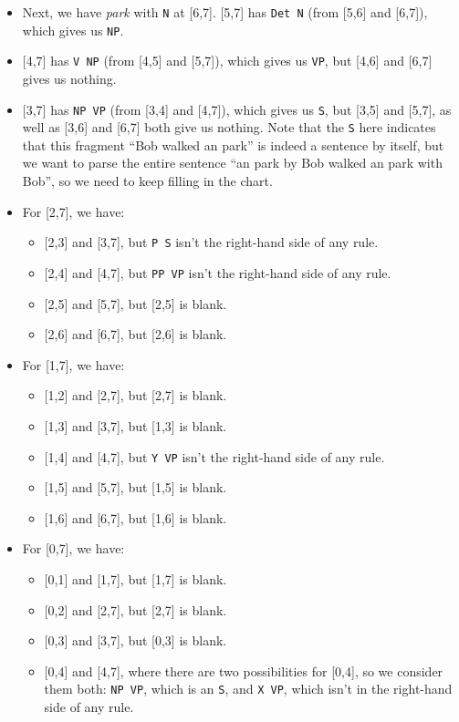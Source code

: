 \documentclass[a4paper]{article}
\begin{document}
\begin{enumerate}
\begin{enumerate}
\begin{enumerate}
\begin{itemize}
\item Next, we have \textit{park} with \texttt{N} at [6,7]. [5,7] has \texttt{Det N} (from [5,6] and [6,7]), which gives us \texttt{NP}.
\item{} [4,7] has \texttt{V NP} (from [4,5] and [5,7]), which gives us \texttt{VP}, but [4,6] and [6,7] gives us nothing.
\item{} [3,7] has \texttt{NP VP} (from [3,4] and [4,7]), which gives us \texttt{S}, but [3,5] and [5,7], as well as [3,6] and [6,7] both give us nothing. Note that the \texttt{S} here indicates that this fragment ``Bob walked an park'' is indeed a sentence by itself, but we want to parse the entire sentence ``an park by Bob walked an park with Bob'', so we need to keep filling in the chart.
\item For [2,7], we have:
\begin{itemize}
\item{} [2,3] and [3,7], but \texttt{P S} isn't the right-hand side of any rule.
\item{} [2,4] and [4,7], but \texttt{PP VP} isn't the right-hand side of any rule.
\item{} [2,5] and [5,7], but [2,5] is blank.
\item{} [2,6] and [6,7], but [2,6] is blank.
\end{itemize}
\item For [1,7], we have:
\begin{itemize}
\item{} [1,2] and [2,7], but [2,7] is blank.
\item{} [1,3] and [3,7], but [1,3] is blank.
\item{} [1,4] and [4,7], but \texttt{Y VP} isn't the right-hand side of any rule.
\item{} [1,5] and [5,7], but [1,5] is blank.
\item{} [1,6] and [6,7], but [1,6] is blank.
\end{itemize}
\item For [0,7], we have:
\begin{itemize}
\item{} [0,1] and [1,7], but [1,7] is blank.
\item{} [0,2] and [2,7], but [2,7] is blank.
\item{} [0,3] and [3,7], but [0,3] is blank.
\item{} [0,4] and [4,7], where there are two possibilities for [0,4], so we consider them both: \texttt{NP VP}, which is an \texttt{S}, and \texttt{X VP}, which isn't in the right-hand side of any rule.

\end{itemize}
\end{itemize}
\end{enumerate}
\end{enumerate}
\end{enumerate}
\end{document}
